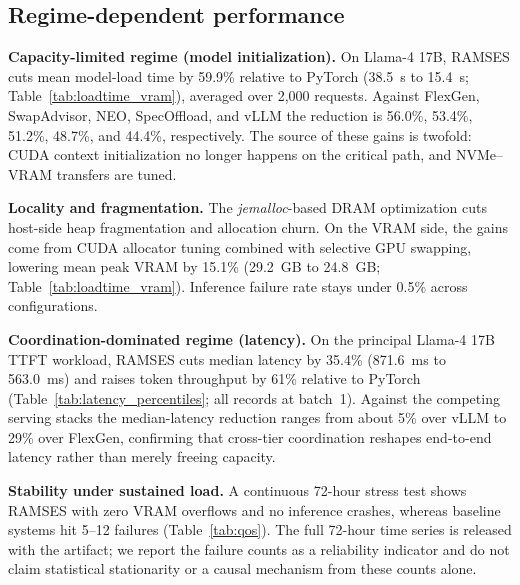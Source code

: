 
\subsection{Regime-dependent performance}
\noindent\textbf{Capacity-limited regime (model initialization).} On Llama-4 17B, RAMSES cuts mean model-load time by 59.9\% relative to PyTorch (38.5~s to 15.4~s; Table~\ref{tab:loadtime_vram}), averaged over 2{,}000 requests.
Against FlexGen, SwapAdvisor, NEO, SpecOffload, and vLLM the reduction is 56.0\%, 53.4\%, 51.2\%, 48.7\%, and 44.4\%, respectively.
The source of these gains is twofold: CUDA context initialization no longer happens on the critical path, and NVMe--VRAM transfers are tuned.



\noindent\textbf{Locality and fragmentation.} The \textit{jemalloc}-based DRAM optimization cuts host-side heap fragmentation and allocation churn.
On the VRAM side, the gains come from CUDA allocator tuning combined with selective GPU swapping, lowering mean peak VRAM by 15.1\% (29.2~GB to 24.8~GB; Table~\ref{tab:loadtime_vram}).
Inference failure rate stays under 0.5\% across configurations.

\noindent\textbf{Coordination-dominated regime (latency).} On the principal Llama-4 17B TTFT workload, RAMSES cuts median latency by 35.4\% (871.6~ms to 563.0~ms) and raises token throughput by 61\% relative to PyTorch (Table~\ref{tab:latency_percentiles}; all records at batch~1).
Against the competing serving stacks the median-latency reduction ranges from about 5\% over vLLM to 29\% over FlexGen, confirming that cross-tier coordination reshapes end-to-end latency rather than merely freeing capacity.

\noindent\textbf{Stability under sustained load.} A continuous 72-hour stress test shows RAMSES with zero VRAM overflows and no inference crashes, whereas baseline systems hit 5--12 failures (Table~\ref{tab:qos}). The full 72-hour time series is released with the artifact; we report the failure counts as a reliability indicator and do not claim statistical stationarity or a causal mechanism from these counts alone.

\noindent{}

